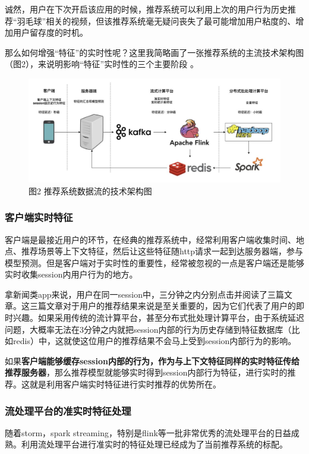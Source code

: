 \documentclass[12pt]{article}
\begin{document}
诚然，用户在下次开启该应用的时候，推荐系统可以利用上次的用户行为历史推荐“羽毛球”相关的视频，但该推荐系统毫无疑问丧失了最可能增加用户粘度的、增加用户留存度的时机。

那么如何增强“特征”的实时性呢？这里我简略画了一张推荐系统的主流技术架构图（图2），来说明影响“特征”实时性的三个主要阶段 。
\begin{figure}[H]
    \centering
    \includegraphics[width=.8\textwidth]{fig/Recommender_System_Data_Stream_Architecture.png}
    \caption*{图2 推荐系统数据流的技术架构图}
\end{figure}

\subsubsection{客户端实时特征}
客户端是最接近用户的环节，在经典的推荐系统中，经常利用客户端收集时间、地点、推荐场景等上下文特征，然后让这些特征随http请求一起到达服务器端，参与模型预测。但是客户端对于实时性的重要性，经常被忽视的一点是客户端还是能够实时收集session内用户行为的地方。

拿新闻类app来说，用户在同一session中，三分钟之内分别点击并阅读了三篇文章。这三篇文章对于用户的推荐结果来说是至关重要的，因为它们代表了用户的即时兴趣。如果采用传统的流计算平台，甚至分布式批处理计算平台，由于系统延迟问题，大概率无法在3分钟之内就把session内部的行为历史存储到特征数据库（比如redis）中，这就使这位用户的推荐结果不会马上受到session内部行为的影响。

如果\textbf{客户端能够缓存session内部的行为，作为与上下文特征同样的实时特征传给推荐服务器}，那么推荐模型就能够实时得到session内部行为特征，进行实时的推荐。这就是利用客户端实时特征进行实时推荐的优势所在。

\subsubsection{流处理平台的准实时特征处理}
随着storm，spark streaming，特别是flink等一批非常优秀的流处理平台的日益成熟。利用流处理平台进行准实时的特征处理已经成为了当前推荐系统的标配。
\end{document}

